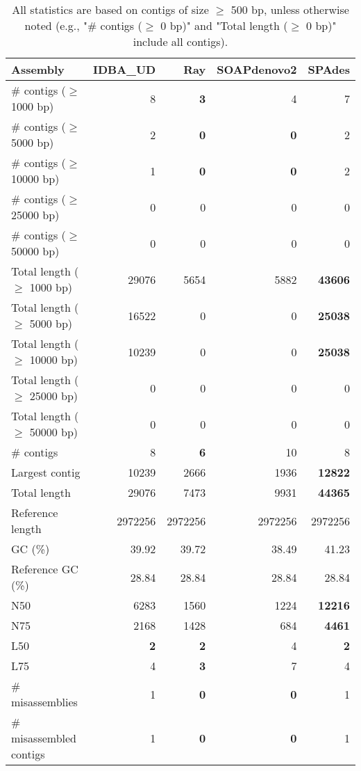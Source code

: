 \documentclass[12pt,a4paper]{article}
\begin{document}
\begin{table}[ht]
\begin{center}
\caption{All statistics are based on contigs of size $\geq$ 500 bp, unless otherwise noted (e.g., "\# contigs ($\geq$ 0 bp)" and "Total length ($\geq$ 0 bp)" include all contigs).}
\begin{tabular}{|l*{4}{|r}|}
\hline
Assembly & IDBA\_UD & Ray & SOAPdenovo2 & SPAdes \\ \hline
\# contigs ($\geq$ 1000 bp) & 8 & {\bf 3} & 4 & 7 \\ \hline
\# contigs ($\geq$ 5000 bp) & 2 & {\bf 0} & {\bf 0} & 2 \\ \hline
\# contigs ($\geq$ 10000 bp) & 1 & {\bf 0} & {\bf 0} & 2 \\ \hline
\# contigs ($\geq$ 25000 bp) & 0 & 0 & 0 & 0 \\ \hline
\# contigs ($\geq$ 50000 bp) & 0 & 0 & 0 & 0 \\ \hline
Total length ($\geq$ 1000 bp) & 29076 & 5654 & 5882 & {\bf 43606} \\ \hline
Total length ($\geq$ 5000 bp) & 16522 & 0 & 0 & {\bf 25038} \\ \hline
Total length ($\geq$ 10000 bp) & 10239 & 0 & 0 & {\bf 25038} \\ \hline
Total length ($\geq$ 25000 bp) & 0 & 0 & 0 & 0 \\ \hline
Total length ($\geq$ 50000 bp) & 0 & 0 & 0 & 0 \\ \hline
\# contigs & 8 & {\bf 6} & 10 & 8 \\ \hline
Largest contig & 10239 & 2666 & 1936 & {\bf 12822} \\ \hline
Total length & 29076 & 7473 & 9931 & {\bf 44365} \\ \hline
Reference length & 2972256 & 2972256 & 2972256 & 2972256 \\ \hline
GC (\%) & 39.92 & 39.72 & 38.49 & 41.23 \\ \hline
Reference GC (\%) & 28.84 & 28.84 & 28.84 & 28.84 \\ \hline
N50 & 6283 & 1560 & 1224 & {\bf 12216} \\ \hline
N75 & 2168 & 1428 & 684 & {\bf 4461} \\ \hline
L50 & {\bf 2} & {\bf 2} & 4 & {\bf 2} \\ \hline
L75 & 4 & {\bf 3} & 7 & 4 \\ \hline
\# misassemblies & 1 & {\bf 0} & {\bf 0} & 1 \\ \hline
\# misassembled contigs & 1 & {\bf 0} & {\bf 0} & 1 \\ \hline

\end{tabular}
\end{center}
\end{table}
\end{document}
